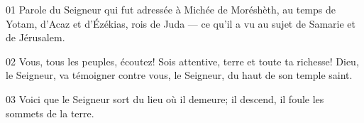 01 Parole du Seigneur qui fut adressée à Michée de Moréshèth, au temps de Yotam, d’Acaz et d’Ézékias, rois de Juda --- ce qu’il a vu au sujet de Samarie et de Jérusalem.

02 Vous, tous les peuples, écoutez! Sois attentive, terre et toute ta richesse! Dieu, le Seigneur, va témoigner contre vous, le Seigneur, du haut de son temple saint.

03 Voici que le Seigneur sort du lieu où il demeure; il descend, il foule les sommets de la terre.
